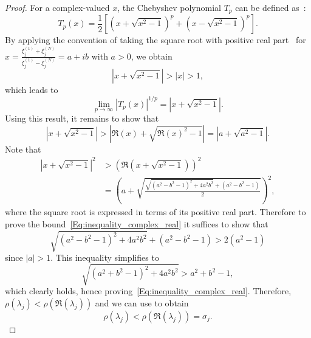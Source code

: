 \documentclass{article}
\theoremstyle{definition}
\begin{document}
{\begin{proof}
			
			{For a complex-valued $x$, 
				the Chebyshev polynomial $T_p$ can be defined as~\cite{gutknecht2002chebyshev}:
				$$
				T_p(x) = \frac{1}{2} \left [ \left( x + \sqrt{x^2 -1} \right)^p + \left( x - \sqrt{x^2 -1} \right)^p \right].
				$$
				By applying the convention of taking the square root with positive real part~\cite[Section 1.1]{bak2010complex} for $x=\frac{\xi_j^{(1)}+\xi_j^{(N)}}{\xi_j^{(1)}-\xi_j^{(N)}} = a+ ib $ with $a > 0$,
				we obtain
				$$\left | x + \sqrt{x^2 -1} \right | > |x| > 1,$$
				which leads to
				$$\lim_{p\rightarrow\infty} \left|T_p(x)\right|^{1/p} = \left|x+\sqrt{x^2-1}\right|.$$ Using this result, it remains to show that
				\begin{equation}
					\label{Eq:inequality_complex_real}
					\left|x  + \sqrt{x^2-1}\right|  >  \left|\Re(x)  + \sqrt{\Re(x)^2-1}\right| = \left|a  + \sqrt{a^2-1}\right|. 
				\end{equation}
				Note that
				\begin{align*}
					\left | x + \sqrt{x^2 -1} \right |^2 & > \left( \Re \left( x + \sqrt{x^2 -1} \right) \right)^2 \\
					& = \left( a + \sqrt{\frac{\sqrt{(a^2 - b^2 - 1)^2 + 4a^2b^2} + (a^2-b^2-1)}{2} } \right)^2,
				\end{align*}
				where the square root is expressed in terms of its positive real part. Therefore to prove the bound~\eqref{Eq:inequality_complex_real} it suffices to show that
				\begin{equation*}
					\sqrt{(a^2 - b^2 - 1)^2 + 4a^2b^2} + (a^2-b^2-1)> 2 (a^2 - 1)
				\end{equation*}
				since $|a| > 1$. This inequality simplifies to 
				$$
				\sqrt{(a^2 + b^2 - 1)^2 + 4a^2b^2} > a^2 + b^2 - 1,
				$$
				which clearly holds, hence proving~\eqref{Eq:inequality_complex_real}. Therefore, $\rho(\lambda_j) < \rho(\Re(\lambda_j))$ and we can use  \cite[Section 5.3]{axelsson1996iterative} to obtain 
				$$\rho(\lambda_j) < \rho(\Re(\lambda_j)) = \sigma_j.$$
			}
		\end{proof}
		
		
		
}
\end{document}
